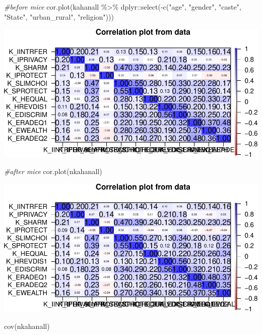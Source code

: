 \documentclass[
]{article}
\newenvironment{Shaded}{\begin{snugshade}}{\end{snugshade}}
\newcommand{\CommentTok}[1]{\textcolor[rgb]{0.56,0.35,0.01}{\textit{#1}}}
\newcommand{\FunctionTok}[1]{\textcolor[rgb]{0.00,0.00,0.00}{#1}}
\newcommand{\NormalTok}[1]{#1}
\newcommand{\SpecialCharTok}[1]{\textcolor[rgb]{0.00,0.00,0.00}{#1}}
\newcommand{\StringTok}[1]{\textcolor[rgb]{0.31,0.60,0.02}{#1}}
\begin{document}
\begin{Shaded}
\begin{Highlighting}[]
\CommentTok{\#before mice }
 \FunctionTok{cor.plot}\NormalTok{(kahanall }\SpecialCharTok{\%\textgreater{}\%}\NormalTok{ dplyr}\SpecialCharTok{::}\FunctionTok{select}\NormalTok{(}\SpecialCharTok{{-}}\FunctionTok{c}\NormalTok{(}\StringTok{"age"}\NormalTok{, }\StringTok{"gender"}\NormalTok{, }\StringTok{"caste"}\NormalTok{, }\StringTok{"State"}\NormalTok{, }\StringTok{"urban\_rural"}\NormalTok{, }\StringTok{"religion"}\NormalTok{)))}
\end{Highlighting}
\end{Shaded}

\includegraphics{withmice_files/figure-latex/unnamed-chunk-12-1.pdf}

\begin{Shaded}
\begin{Highlighting}[]
\CommentTok{\#after mice}
 \FunctionTok{cor.plot}\NormalTok{(nkahanall)}
\end{Highlighting}
\end{Shaded}

\includegraphics{withmice_files/figure-latex/unnamed-chunk-12-2.pdf}

\begin{Shaded}
\begin{Highlighting}[]
\FunctionTok{cov}\NormalTok{(nkahanall)}
\end{Highlighting}
\end{Shaded}
\end{document}
